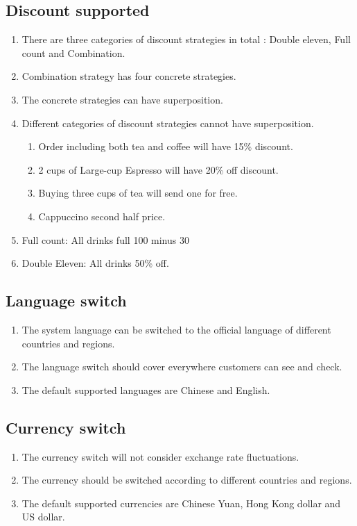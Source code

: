 \documentclass[a4paper]{report}
\begin{document}
\subsection{Discount supported}
\begin{enumerate}
\item There are three categories of discount strategies in total : Double eleven, Full count and Combination.
\item Combination strategy has four concrete strategies.
\item The concrete strategies can have superposition.
\item Different categories of discount strategies cannot have superposition.
\begin{enumerate}
\item Order including both tea and coffee will have 15\% discount.
\item 2 cups of Large-cup Espresso will have 20\% off discount.
\item Buying three cups of tea will send one for free.
\item Cappuccino second half price.
\end{enumerate}
\item Full count: All drinks full 100 minus 30
\item Double Eleven: All drinks 50\% off.
\end{enumerate}

\subsection{Language switch}
\begin{enumerate}
\item The system language can be switched to the official language of different countries and regions.
\item The language switch should cover everywhere customers can see and check.
\item The default supported languages are Chinese and English.
\end{enumerate}

\subsection{Currency switch}
\begin{enumerate}
\item The currency switch will not consider exchange rate fluctuations.
\item The currency should be switched according to different countries and regions.
\item The default supported currencies are Chinese Yuan, Hong Kong dollar and US dollar.
\end{enumerate}
\end{document}
